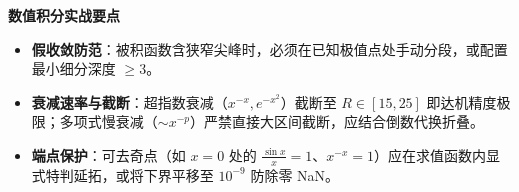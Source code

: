 \textbf{数值积分实战要点}
\begin{itemize}
    \item \textbf{假收敛防范}：被积函数含狭窄尖峰时，必须在已知极值点处手动分段，或配置最小细分深度 $\ge 3$。
    \item \textbf{衰减速率与截断}：超指数衰减（$x^{-x}, e^{-x^2}$）截断至 $R \in [15, 25]$ 即达机精度极限；多项式慢衰减（$\sim x^{-p}$）严禁直接大区间截断，应结合倒数代换折叠。
    \item \textbf{端点保护}：可去奇点（如 $x=0$ 处的 $\frac{\sin x}{x}=1$、$x^{-x}=1$）应在求值函数内显式特判延拓，或将下界平移至 $10^{-9}$ 防除零 NaN。
\end{itemize}
